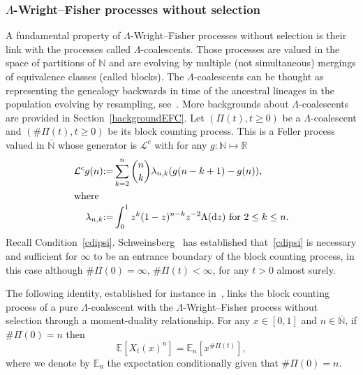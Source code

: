 \documentclass[AHL,Unicode,longabstracts,published]{cedram}
\newcommand{\ddr}{\mathrm{d}}
\newcommand{\bbN}{\mathbb{N}}
\newcommand{\bbR}{\mathbb{R}}
\newcommand{\bbE}{\mathbb{E}}
\newcommand{\clL}{\mathcal{L}}
\begin{document}
\subsubsection{\texorpdfstring{$\Lambda$}{Lambda}-Wright--Fisher processes without selection}

A fundamental property of $\Lambda$-Wright--Fisher processes without selection is their link with the processes called $\Lambda$-coalescents. Those processes are valued in the space of partitions of $\bbN$ and are evolving by multiple (not simultaneous) mergings of equivalence classes (called blocks). The $\Lambda$-coalescents can be thought as representing the genealogy backwards in time of the ancestral lineages in the population evolving by resampling, see~\cite{MR1990057}. More backgrounds about $\Lambda$-coalescents are provided in Section~\ref{backgroundEFC}. Let $(\Pi(t),t\geq 0)$ be a $\Lambda$-coalescent and $(\#\Pi(t),t\geq 0)$ be its block counting process. This is a Feller process valued in $\bar{\bbN}$ whose generator is $\clL^{c}$ with for any $g:\bbN\mapsto \bbR$
\begin{align}
\clL^c g(n){:=}&\sum_{k=2}^{n}\binom{n}{k}\lambda_{n,k}(g(n-k+1)-g(n)),\label{coalpart}
\\
\intertext{where}
\lambda_{n,k}{:=}&\int_0^1 z^{k}(1-z)^{n-k}z^{-2}\Lambda(\ddr z) \text{ for } 2\leq k\leq n.\label{lambdank}
\end{align}
Recall Condition~\eqref{cdipsi}. Schweinsberg~\cite{CDI} has established that~\eqref{cdipsi} is necessary and sufficient for $\infty$ to be an entrance boundary of the block counting process, in this case although $\#\Pi(0)=\infty$, $\#\Pi(t)<\infty$, for any $t>0$ almost surely.

The following identity, established for instance in~\cite[Theorem~1, Equation~(8)]{LGB2}, links the block counting process of a pure $\Lambda$-coalescent with the $\Lambda$-Wright--Fisher process without selection through a moment-duality relationship. For any $x\in [0,1]$ and $n\in \bar{\bbN}$, if $\#\Pi(0)=n$ then
\begin{equation}\label{dualclassic}
\bbE\left[X_t(x)^n\right]=\bbE_n\left[x^{\#\Pi(t)}\right],
\end{equation}
where we denote by $\bbE_n$ the expectation conditionally given that $\#\Pi(0)=n$.
\end{document}
